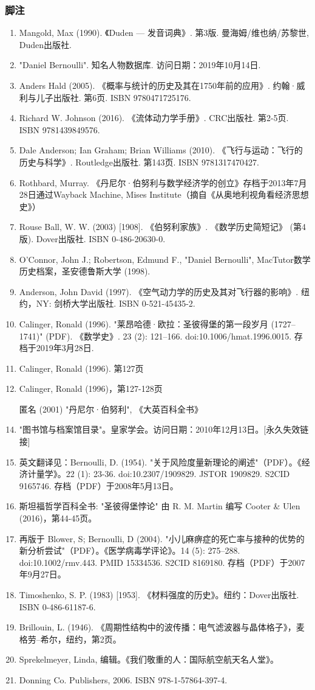 \subsubsection{脚注}  
\begin{enumerate}
\item Mangold, Max (1990). 《Duden — 发音词典》. 第3版. 曼海姆/维也纳/苏黎世, Duden出版社.  
\item "Daniel Bernoulli". 知名人物数据库. 访问日期：2019年10月14日.  
\item Anders Hald (2005). 《概率与统计的历史及其在1750年前的应用》. 约翰·威利与儿子出版社. 第6页. ISBN 9780471725176.  
\item Richard W. Johnson (2016). 《流体动力学手册》. CRC出版社. 第2-5页. ISBN 9781439849576.  
\item Dale Anderson; Ian Graham; Brian Williams (2010). 《飞行与运动：飞行的历史与科学》. Routledge出版社. 第143页. ISBN 9781317470427.  
\item Rothbard, Murray. 《丹尼尔·伯努利与数学经济学的创立》存档于2013年7月28日通过Wayback Machine, Mises Institute（摘自《从奥地利视角看经济思想史》）  
\item Rouse Ball, W. W. (2003) [1908]. 《伯努利家族》. 《数学历史简短记》 (第4版). Dover出版社. ISBN 0-486-20630-0.  
\item O'Connor, John J.; Robertson, Edmund F., "Daniel Bernoulli", MacTutor数学历史档案，圣安德鲁斯大学 (1998).  
\item Anderson, John David (1997). 《空气动力学的历史及其对飞行器的影响》. 纽约，NY: 剑桥大学出版社. ISBN 0-521-45435-2.  
\item Calinger, Ronald (1996). "莱昂哈德·欧拉：圣彼得堡的第一段岁月 (1727–1741)" (PDF). 《数学史》. 23 (2): 121–166. doi:10.1006/hmat.1996.0015. 存档于2019年3月28日.
\item Calinger, Ronald (1996). 第127页  
\item Calinger, Ronald (1996)，第127-128页  
\item [匿名] (2001) "丹尼尔·伯努利", 《大英百科全书》  
\item "图书馆与档案馆目录"。皇家学会。访问日期：2010年12月13日。[永久失效链接]  
\item 英文翻译见：Bernoulli, D. (1954). "关于风险度量新理论的阐述"（PDF）。《经济计量学》。22 (1): 23-36. doi:10.2307/1909829. JSTOR 1909829. S2CID 9165746. 存档（PDF）于2008年5月13日。  
\item 斯坦福哲学百科全书: "圣彼得堡悖论" 由 R. M. Martin 编写  
Cooter & Ulen (2016)，第44-45页。  
\item 再版于 Blower, S; Bernoulli, D (2004). "小儿麻痹症的死亡率与接种的优势的新分析尝试"（PDF）。《医学病毒学评论》。14 (5): 275–288. doi:10.1002/rmv.443. PMID 15334536. S2CID 8169180. 存档（PDF）于2007年9月27日。  
\item Timoshenko, S. P. (1983) [1953]. 《材料强度的历史》。纽约：Dover出版社. ISBN 0-486-61187-6.  
\item Brillouin, L. (1946). 《周期性结构中的波传播：电气滤波器与晶体格子》，麦格劳–希尔，纽约，第2页。  
\item Sprekelmeyer, Linda, 编辑。《我们敬重的人：国际航空航天名人堂》。\item Donning Co. Publishers, 2006. ISBN 978-1-57864-397-4.  
\end{enumerate}
